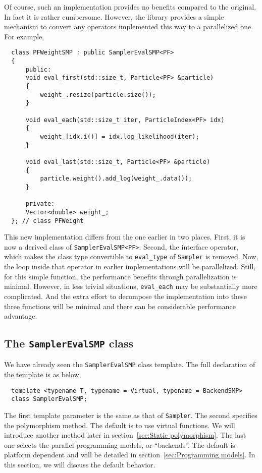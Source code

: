 Of course, such an implementation provides no benefits compared to the
original. In fact it is rather cumbersome. However, the library provides a
simple mechanism to convert any operators implemented this way to a
parallelized one. For example,
\begin{Verbatim}
  class PFWeightSMP : public SamplerEvalSMP<PF>
  {
      public:
      void eval_first(std::size_t, Particle<PF> &particle)
      {
          weight_.resize(particle.size());
      }

      void eval_each(std::size_t iter, ParticleIndex<PF> idx)
      {
          weight_[idx.i()] = idx.log_likelihood(iter);
      }

      void eval_last(std::size_t, Particle<PF> &particle)
      {
          particle.weight().add_log(weight_.data());
      }

      private:
      Vector<double> weight_;
  }; // class PFWeight
\end{Verbatim}
This new implementation differs from the one earlier in two places. First, it
is now a derived class of \verb|SamplerEvalSMP<PF>|. Second, the interface
operator, which makes the class type convertible to \verb|eval_type| of
\verb|Sampler| is removed. Now, the loop inside that operator in earlier
implementations will be parallelized. Still, for this simple function, the
performance benefits through parallelization is minimal. However, in less
trivial situations, \verb|eval_each| may be substantially more complicated. And
the extra effort to decompose the implementation into these three functions
will be minimal and there can be considerable performance advantage.

\subsection{The \texttt{SamplerEvalSMP} class}
\label{sub:The SamplerEvalSMP class}

We have already seen the \verb|SamplerEvalSMP| class template. The full
declaration of the template is as below,
\begin{Verbatim}
  template <typename T, typename = Virtual, typename = BackendSMP>
  class SamplerEvalSMP;
\end{Verbatim}
The first template parameter is the same as that of \verb|Sampler|. The second
specifies the polymorphism method. The default is to use virtual functions. We
will introduce another method later in section~\ref{sec:Static polymorphism}.
The last one selects the parallel programming models, or ``backends''. The
default is platform dependent and will be detailed in
section~\ref{sec:Programming models}. In this section, we will discuss the
default behavior.

